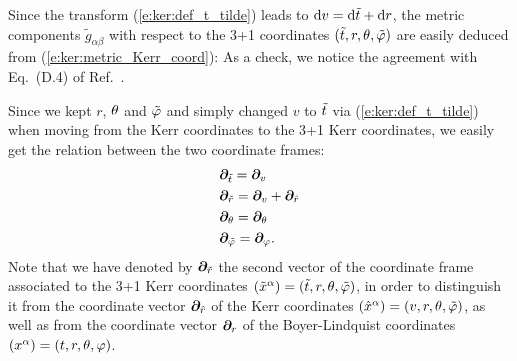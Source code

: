 Since the transform (\ref{e:ker:def_t_tilde}) leads to $\mathrm{d} v = \mathrm{d}{\tilde t} + \mathrm{d} r$,
the metric components $\tilde{g}_{\alpha\beta}$ with respect to the
3+1 coordinates $({\tilde t},r,\theta,{\tilde\varphi})$ are easily deduced from
(\ref{e:ker:metric_Kerr_coord}):
\be \label{e:ker:metric_Kerr_3p1}
\ee
As a check, we notice the agreement with Eq.~(D.4) of Ref.~\cite{GourgJ06}.

Since we kept $r$, $\theta$ and ${\tilde\varphi}$ and simply changed
$v$ to ${\tilde t}$ via (\ref{e:ker:def_t_tilde}) when moving from the Kerr
coordinates to the 3+1 Kerr coordinates, we easily get the relation
between the two coordinate frames:
\begin{subequations}
\label{e:ker:frame_Kerr3p1_Kerr}
\begin{align}
    & \bm{\partial}_{\tilde t} = \bm{\partial}_v \\
    & \bm{\partial}_{\tilde r} = \bm{\partial}_v + \bm{\partial}_{\hat{r}} \\
    & \bm{\partial}_\theta = \bm{\partial}_\theta \\
    & \bm{\partial}_{\tilde\varphi} = \bm{\partial}_\varphi .
\end{align}
\end{subequations}
Note that we have denoted by $\bm{\partial}_{\tilde r}$ the second vector of the
coordinate frame associated to the 3+1 Kerr coordinates
$(\tilde{x}^\alpha) = ({\tilde t}, r, \theta,{\tilde\varphi})$, in order to distinguish it from
the coordinate vector $\bm{\partial}_{\hat r}$ of the Kerr coordinates
$(\hat{x}^\alpha) = (v, r, \theta,{\tilde\varphi})$, as well as from the coordinate vector
$\bm{\partial}_r$ of the Boyer-Lindquist coordinates
$(x^\alpha) = (t,r,\theta,\varphi)$.

